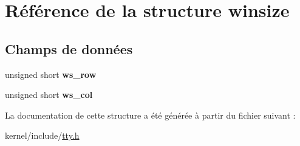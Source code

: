 \hypertarget{structwinsize}{\section{\-Référence de la structure winsize}
\label{structwinsize}
}
\subsection*{\-Champs de données}
\begin{DoxyCompactItemize}
\item 
\hypertarget{structwinsize_a73698fa1d966374b0701e4bf225f0141}{unsigned short {\bfseries ws\-\_\-row}}\label{structwinsize_a73698fa1d966374b0701e4bf225f0141}

\item 
\hypertarget{structwinsize_a80bedf71a49fd324e0d92d0702cc7005}{unsigned short {\bfseries ws\-\_\-col}}\label{structwinsize_a80bedf71a49fd324e0d92d0702cc7005}

\end{DoxyCompactItemize}


\-La documentation de cette structure a été générée à partir du fichier suivant \-:\begin{DoxyCompactItemize}
\item 
kernel/include/\hyperlink{tty_8h}{tty.\-h}\end{DoxyCompactItemize}
